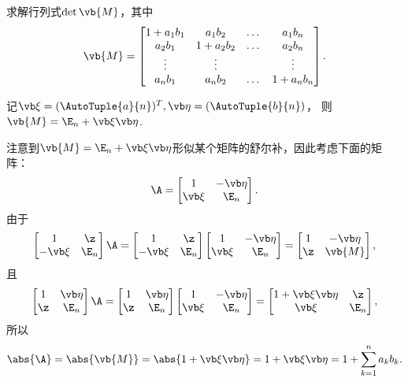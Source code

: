 \begin{example}
\def\M{\vb{M}}
求解行列式\(\det \M\)，其中\[
	\M = \begin{bmatrix}
		1+a_1 b_1 & a_1 b_2 & \dots & a_1 b_n \\
		a_2 b_1 & 1+a_2 b_2 & \dots & a_2 b_n \\
		\vdots & \vdots & & \vdots \\
		a_n b_1 & a_n b_2 & \dots & 1+a_n b_n
	\end{bmatrix}.
\]
\begin{solution}
记\(\a = (\AutoTuple{a}{n})^T,
\b = (\AutoTuple{b}{n})\)，
则\(\M = \E_n + \a\b\).

注意到\(\M = \E_n + \a\b\)形似某个矩阵的舒尔补，因此考虑下面的矩阵：\[
	\A = \begin{bmatrix}
		1 & -\b \\
		\a & \E_n
	\end{bmatrix}.
\]由于\[
	\begin{bmatrix}
		1 & \z \\
		-\a & \E_n
	\end{bmatrix} \A
	= \begin{bmatrix}
		1 & \z \\
		-\a & \E_n
	\end{bmatrix}
	\begin{bmatrix}
		1 & -\b \\
		\a & \E_n
	\end{bmatrix}
	= \begin{bmatrix}
		1 & -\b \\
		\z & \M
	\end{bmatrix},
\]
且\[
	\begin{bmatrix}
		1 & \b \\
		\z & \E_n
	\end{bmatrix} \A
	= \begin{bmatrix}
		1 & \b \\
		\z & \E_n
	\end{bmatrix}
	\begin{bmatrix}
		1 & -\b \\
		\a & \E_n
	\end{bmatrix}
	= \begin{bmatrix}
		1+\a\b & \z \\
		\a & \E_n
	\end{bmatrix},
\]
所以\[
	\abs{\A}
	= \abs{\M}
	= \abs{1+\a\b}
	= 1+\a\b
	= 1 + \sum_{k=1}^n a_k b_k.
\]
\end{solution}
\end{example}
